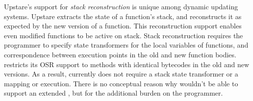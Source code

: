 Upstare's support for {\em stack reconstruction} is unique among dynamic
updating systems.
Upstare extracts the state of a function's stack, and
reconstructs it as expected by the new version of a function. This
reconstruction support enables even modified functions to be active on
stack. Stack reconstruction requires the programmer to specify state
transformers for the local variables of functions, and correspondence
between execution points in the old and new function bodies. \JV restricts
its \acf{OSR} support to methods with identical bytecodes in the old and
new versions. As a result, \JV currently does not require a stack state
transformer or a mapping or execution. There is no conceptual reason why \JV
wouldn't be able to support an extended \OSR, but for the additional burden
on the programmer.
